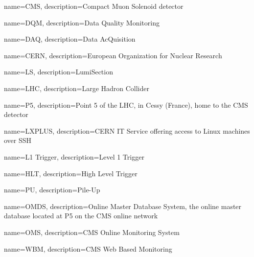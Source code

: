 {
    name=CMS,
    description={Compact Muon Solenoid detector}
}

{
    name=DQM,
    description={Data Quality Monitoring}
}

{
    name=DAQ,
    description={Data AcQuisition}
}

{
    name=CERN,
    description={European Organization for Nuclear Research}
}

{
    name=LS,
    description={LumiSection}
}

{
    name=LHC,
    description={Large Hadron Collider}
}


{
    name=P5,
    description={Point 5 of the LHC, in Cessy (France), home to the CMS detector}
}

{
    name=LXPLUS,
    description={CERN IT Service offering access to Linux machines over SSH}
}

{
    name=L1 Trigger,
    description={Level 1 Trigger}
}

{
    name=HLT,
    description={High Level Trigger}
}

{
    name=PU,
    description={Pile-Up}
}

{
    name=OMDS,
    description={Online Master Database System, the online master database located at P5 on the CMS online network}
}

{
    name=OMS,
    description={CMS Online Monitoring System}
}

{
    name=WBM,
    description={CMS Web Based Monitoring}
}



